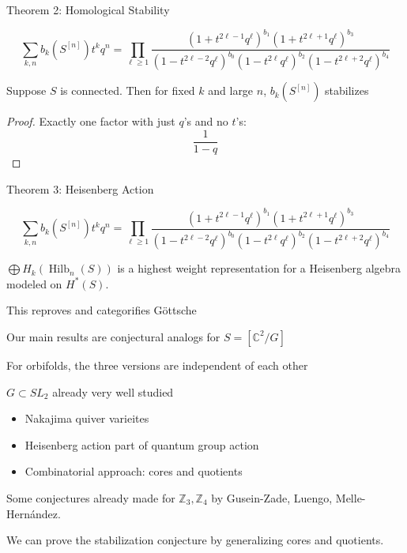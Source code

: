 \documentclass{beamer}
\DeclareMathOperator{\Hilb}{Hilb}
\newcommand{\C}{\mathbb{C}}
\newcommand{\Z}{\mathbb{Z}}
\begin{document}
\begin{frame}{Theorem 2: Homological Stability}
  \begin{Theorem}[G\"ottsche, 1990]
$$\sum_{k,n} b_k(S^{[n]})t^k q^n=\prod_{\ell\geq 1} \frac{(1+t^{2\ell-1}q^\ell)^{b_1}(1+t^{2\ell+1}q^\ell)^{b_3}}{(1-t^{2\ell-2}q^\ell)^{b_0}(1-t^{2\ell}q^\ell)^{b_2}(1-t^{2\ell+2}q^\ell)^{b_4}}$$
\end{Theorem}
\begin{corollary}  Suppose $S$ is connected.
Then for fixed $k$ and large $n$, $b_{k}(S^{[n]})$ stabilizes
\end{corollary}

\begin{proof}
Exactly one factor with just $q$'s and no $t$'s:
$$\frac{1}{1-q}$$ 

\end{proof}


\end{frame}


\begin{frame}{Theorem 3: Heisenberg Action}
  \begin{Theorem}[G\"ottsche, 1990]
$$\sum_{k,n} b_k(S^{[n]})t^k q^n=\prod_{\ell\geq 1} \frac{(1+t^{2\ell-1}q^\ell)^{b_1}(1+t^{2\ell+1}q^\ell)^{b_3}}{(1-t^{2\ell-2}q^\ell)^{b_0}(1-t^{2\ell}q^\ell)^{b_2}(1-t^{2\ell+2}q^\ell)^{b_4}}$$
\end{Theorem}
\begin{Theorem}
$\bigoplus H_k(\Hilb_n(S))$ is a highest weight representation for a Heisenberg algebra modeled on $H^*(S)$.
\end{Theorem}
This reproves and categorifies G\"ottsche
\end{frame}

\begin{frame}{Our main results are conjectural analogs for $S=[\C^2/G]$}

For orbifolds, the three versions are independent of each other

\begin{block}{$G\subset SL_2$ already very well studied}
\begin{itemize}
\item Nakajima quiver varieites
\item Heisenberg action part of quantum group action
\item Combinatorial approach: cores and quotients
\end{itemize}
\end{block}

Some conjectures already made for $\Z_3, \Z_4$ by Gusein-Zade, Luengo, Melle-Hern\'andez.

We can prove the stabilization conjecture by generalizing cores and quotients.

\end{frame}
\end{document}
